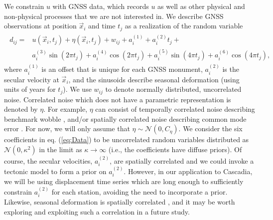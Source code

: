 \documentclass[extra,mreferee]{gji}
\begin{document}
We constrain $u$ with GNSS data, which records $u$ as well as other physical and non-physical processes that we are not interested in. We describe GNSS observations at position $\vec{x}_i$ and time $t_j$ as a realization of the random variable 
\begin{align}\label{eq:Data}
\begin{split}
d_{ij} = &u(\vec{x}_i,t_j) + \eta(\vec{x}_i,t_j) + w_{ij} + a^{(1)}_i + a^{(2)}_it_j + \\
         &a^{(3)}_i\sin(2 \pi t_j) + a^{(4)}_i\cos(2 \pi t_j) + a^{(5)}_i\sin(4 \pi t_j) + a^{(6)}_i\cos(4 \pi t_j), 
\end{split}
\end{align}
where $a^{(1)}_{i}$ is an offset that is unique for each GNSS monument, $a^{(2)}_{i}$ is the secular velocity at $\vec{x}_i$, and the sinusoids describe seasonal deformation (using units of years for $t_j$). We use $w_{ij}$ to denote normally distributed, uncorrelated noise. Correlated noise which does not have a parametric representation is denoted by $\eta$.  For example, $\eta$ can consist of temporally correlated noise describing benchmark wobble \citep[e.g.,][]{Wyatt1982,Wyatt1989}, and/or spatially correlated noise describing common mode error \citep[e.g.,][]{Wdowinski1997}. For now, we will only assume that $\eta \sim \mathcal{N}(0,C_\eta)$. We consider the six coefficients in eq. (\ref{eq:Data}) to be uncorrelated random variables distributed as $\mathcal{N}(0,\kappa^2)$ in the limit as $\kappa \to \infty$ (i.e., the coefficients have diffuse priors). Of course, the secular velocities, $a^{(2)}_{i}$, are spatially correlated and we could invoke a tectonic model to form a prior on $a^{(2)}_{i}$. However, in our application to Cascadia, we will be using displacement time series which are long enough to sufficiently constrain $a^{(2)}_{i}$ for each station, avoiding the need to incorporate a prior. Likewise, seasonal deformation is spatially correlated \citep{Dong2002,Langbein2008}, and it may be worth exploring and exploiting such a correlation in a future study. 
\end{document}
